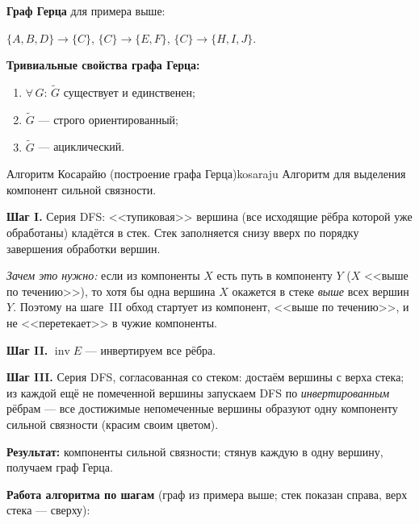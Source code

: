 \textbf{Граф Герца} для примера выше:

$\{A,B,D\} \to \{C\}$,\quad
$\{C\} \to \{E,F\}$,\quad
$\{C\} \to \{H,I,J\}$.


\medskip
\textbf{Тривиальные свойства графа Герца:}
\begin{enumerate}
  \item $\forall\, G$:\; $\tilde{G}$ существует и единственен;
  \item $\tilde{G}$ --- строго ориентированный;
  \item $\tilde{G}$ --- ациклический.
\end{enumerate}

\bigskip
\begin{algo}{Алгоритм Косарайю (построение графа Герца)}{kosaraju}
Алгоритм для выделения компонент сильной связности.

\medskip
\textbf{Шаг I.} Серия DFS: <<тупиковая>> вершина (все исходящие рёбра
которой уже обработаны) кладётся в стек. Стек заполняется снизу вверх
по порядку завершения обработки вершин.

\textit{Зачем это нужно:} если из компоненты $X$ есть путь в компоненту
$Y$ ($X$ <<выше по течению>>), то хотя бы одна вершина $X$ окажется в
стеке \emph{выше} всех вершин $Y$. Поэтому на шаге~III обход стартует
из компонент, <<выше по течению>>, и не <<перетекает>> в чужие компоненты.

\textbf{Шаг II.} $\operatorname{inv} E$ --- инвертируем все рёбра.

\textbf{Шаг III.} Серия DFS, согласованная со стеком: достаём вершины
с верха стека; из каждой ещё не помеченной вершины запускаем DFS по
\emph{инвертированным} рёбрам --- все достижимые непомеченные вершины
образуют одну компоненту сильной связности (красим своим цветом).

\textbf{Результат:} компоненты сильной связности; стянув каждую в одну
вершину, получаем граф Герца.

\medskip
\noindent\textbf{Работа алгоритма по шагам} (граф из примера выше;
стек показан справа, верх стека --- сверху):


\end{algo}
